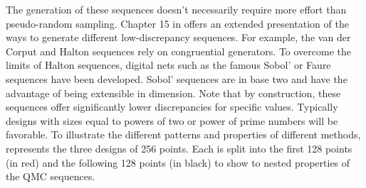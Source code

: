 
The generation of these sequences doesn't necessarily require more effort than pseudo-random sampling.
Chapter 15 in \citet{owen_2013} offers an extended presentation of the ways to generate different low-discrepancy sequences. 
For example, the van der Corput and Halton sequences rely on congruential generators. 
To overcome the limits of Halton sequences, digital nets such as the famous Sobol' or Faure sequences have been developed.  
Sobol' sequences are in base two and have the advantage of being extensible in dimension. 
Note that by construction, these sequences offer significantly lower discrepancies for specific values. 
Typically designs with sizes equal to powers of two or power of prime numbers will be favorable. 
To illustrate the different patterns and properties of different methods,  represents the three designs of 256 points. 
Each is split into the first 128 points (in red) and the following 128 points (in black) to show to nested properties of the QMC sequences.

